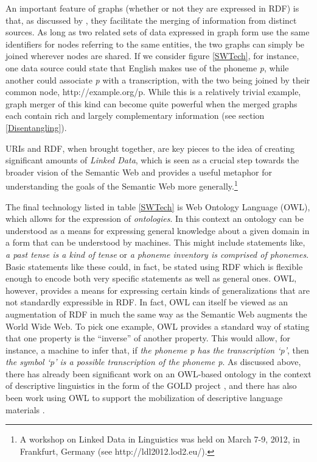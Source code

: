 \documentclass[12pt]{article}
\newcommand{\sref}[1]{section \ref{#1}}
\newcommand{\tref}[1]{table \ref{#1}}
\newcommand{\fref}[1]{figure \ref{#1}}
\newcommand\namecite{\citet}
\renewcommand\cite{\citep}
\begin{document}
An important feature of graphs (whether or not they are expressed in RDF) is
that, as discussed by \namecite{IdeSuderman:2007}, they facilitate the merging
of information from distinct sources. As long as two related sets of data
expressed in graph form use the same identifiers for nodes referring to the same
entities, the two graphs can simply be joined wherever nodes are shared. If we
consider \fref{SWTech}, for instance, one data source could state that English
makes use of the phoneme \emph{p}, while another could associate \emph{p} with a
transcription, with the two being joined by their common node,
http://example.org/p. While this is a relatively trivial example, graph merger
of this kind can become quite powerful when the merged graphs each contain rich
and largely complementary information (see \sref{Disentangling}).

URIs and RDF, when brought together, are key pieces to the idea of creating
significant amounts of \emph{Linked Data}, which is seen as a crucial step
towards the broader vision of the Semantic Web \cite[15]{BizerEtAl:2009}
and provides a useful metaphor for understanding the goals of the Semantic
Web more generally.{\footnote{A workshop on Linked Data in Linguistics was
held on March 7-9, 2012, in Frankfurt, Germany (see http://ldl2012.lod2.eu/).}}

The final technology listed in \tref{SWTech} is Web Ontology Language (OWL),
which allows for the expression of \emph{ontologies}. In this context an
ontology can be understood as a means for expressing general knowledge about a
given domain in a form that can be understood by machines. This might include
statements like, \emph{a past tense is a kind of tense} or \emph{a phoneme
inventory is comprised of phonemes}. Basic statements like these could, in fact,
be stated using RDF which is flexible enough to encode both very specific
statements as well as general ones. OWL, however, provides a means for
expressing certain kinds of generalizations that are not standardly expressible
in RDF. In fact, OWL can itself be viewed as an augmentation of RDF in much the
same way as the Semantic Web augments the World Wide Web. To pick one example,
OWL provides a standard way of stating that one property is the ``inverse'' of
another property. This would allow, for instance, a machine to infer that, if
\emph{the phoneme \emph{p} has the transcription `p'}, then \emph{the symbol
`{p}' is a possible transcription of the phoneme \emph{p}}. As discussed above,
there has already been significant work on an OWL-based ontology in the context
of descriptive linguistics in the form of the GOLD project
\cite{FarrarLangendoen:2003,FarrarLewis:2007,FarrarLangendoen:2009}, and there
has also been work using OWL to support the mobilization of descriptive language
materials \cite{BeckEtAl:2007}.
\end{document}
